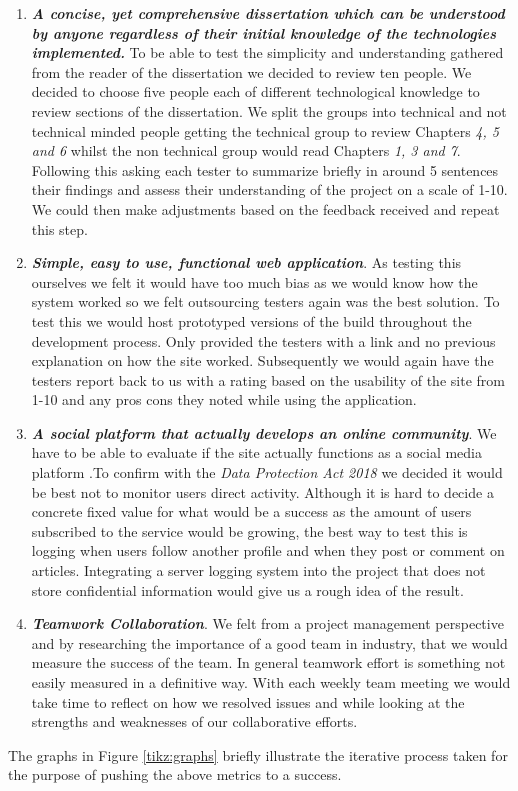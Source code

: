 \begin{enumerate}
  \item \textbf{\textit{A  concise,  yet  comprehensive  dissertation  which  can  be  understood  by
anyone  regardless  of  their  initial  knowledge  of  the  technologies  implemented.}} To be able to test the simplicity and understanding gathered from the reader of the dissertation we decided to review ten people. We decided to choose five people each of different technological knowledge to review sections of the dissertation. We split the groups into technical and not technical minded people getting the technical group to review Chapters \textit{4, 5 and 6} whilst the non technical group would read Chapters \textit{1, 3 and 7}. Following this asking each tester to summarize briefly in around 5 sentences their findings and assess their understanding of the project on a scale of 1-10. We could then make adjustments based on the feedback received and repeat this step.

  \item \textbf{\textit{ Simple, easy to use, functional web application}}. As testing this ourselves we felt it would have too much bias as we would know how the system worked so we felt outsourcing testers again was the best solution. To test this we would host prototyped versions of the build throughout the development process. Only provided the testers with a link and no previous explanation on how the site worked. Subsequently we would again have the testers report back to us with a rating based on the usability of the site from 1-10 and any pros cons they noted while using the application.
  
  \item \textbf{\textit{A social platform that actually develops an online community}}. We have to be able to evaluate if the site actually functions as a social media platform .To confirm with the \textit{Data Protection Act 2018} \cite{dpa} we decided it would be best not to monitor users direct activity. Although it is hard to decide a concrete fixed value for what would be a success as the amount of users subscribed to the service would be growing, the best way to test this is logging when users follow another profile and when they post or comment on articles. Integrating a server logging system into the project that does not store confidential information would give us a rough idea of the result.
  
  \item \textbf{\textit{Teamwork Collaboration}}. We felt from a project management perspective and by researching the importance of a good team in industry, that we would measure the success of the team. In general teamwork effort is something not easily measured in a definitive way. With each weekly team meeting we would take time to reflect on how we resolved issues and while looking at the strengths and weaknesses of our collaborative efforts. 

\end{enumerate}
 The graphs in Figure \ref{tikz:graphs} briefly illustrate the iterative process taken for the purpose of pushing the above metrics to a success.
 
